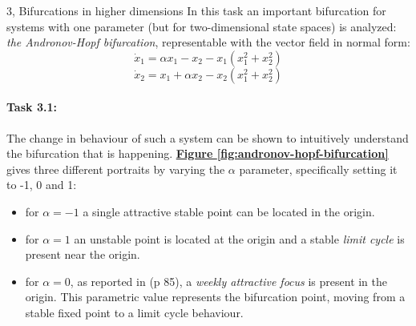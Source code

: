 \documentclass[10pt,a4paper]{article}
\begin{document}
\begin{task}{3, Bifurcations in higher dimensions} \label{sec:task3}
In this task an important bifurcation for systems with one parameter (but for two-dimensional state spaces) is analyzed: \textit{the Andronov-Hopf bifurcation}, representable with the vector field in normal form:
$$\dot x_1 = \alpha x_1 - x_2 - x_1(x_1^2 + x_2^2)$$
$$\dot x_2 = x_1 + \alpha x_2 - x_2(x_1^2 + x_2^2)$$

\paragraph{Task 3.1:}
The change in behaviour of such a system can be shown to intuitively understand the bifurcation that is happening. \textbf{\hyperref[fig:andronov-hopf-bifurcation]{Figure \ref{fig:andronov-hopf-bifurcation}}} gives three different portraits by varying the $\alpha$ parameter, specifically setting it to -1, 0 and 1:
\begin{itemize}
    \item for $\alpha=-1$ a single attractive stable point can be located in the origin.
    \item  for $\alpha=1$ an unstable point is located at the origin and a stable \textit{limit cycle} is present near the origin.
    \item for $\alpha=0$, as reported in \cite{kuznetsov} (p 85), a \textit{weekly attractive focus} is present in the origin. This parametric value represents the bifurcation point, moving from a stable fixed point to a limit cycle behaviour.
\end{itemize}
\begin{figure}[H]
    \centering
    \hfill

\end{figure}
\end{task}
\end{document}
